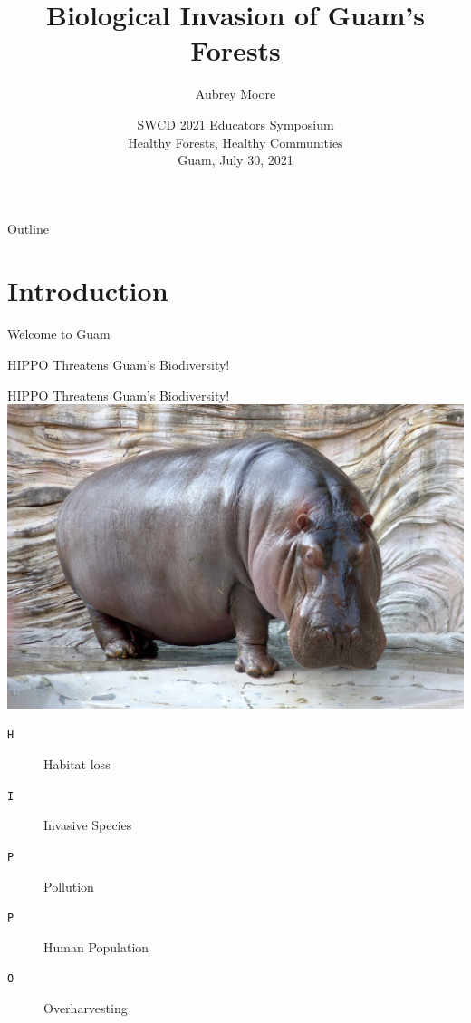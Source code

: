 \documentclass[]{beamer}
\title[Biological Invasion of Guam's Forests]{Biological Invasion of Guam's Forests}
\author{Aubrey Moore}
\institute[University of Guam]{College of Natural and Applied Sciences\\University of Guam}
\date[]{SWCD 2021 Educators Symposium\\Healthy Forests, Healthy Communities\\Guam, July 30, 2021}
\begin{document}
\maketitle

\begin{frame}{Outline}
    \tableofcontents
\end{frame}

\section{Introduction}

\begin{frame}{Welcome to Guam}
\end{frame}

\begin{frame}{HIPPO Threatens Guam's Biodiversity!}
\end{frame}
 
\begin{frame}{HIPPO Threatens Guam's Biodiversity!}
    \includegraphics[height=0.5\textheight]{hippo.jpg}
    \begin{description}
        \item [\texttt{H}] Habitat loss
        \item [\texttt{I}] Invasive Species
        \item [\texttt{P}] Pollution 
        \item [\texttt{P}] Human Population
        \item [\texttt{O}] Overharvesting
    \end{description}
\end{frame}
\end{document}
